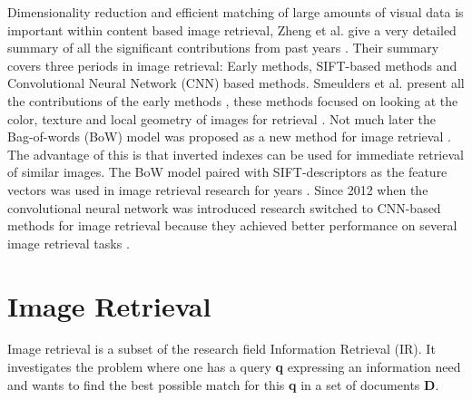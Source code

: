 \documentclass{article}
\begin{document}
Dimensionality reduction and efficient matching of large amounts of visual data is important within content based image retrieval, Zheng et al. give a very detailed summary of all the significant contributions from past years \cite{zheng2018sift}. Their summary covers three periods in image retrieval: Early methods, SIFT-based methods and Convolutional Neural Network (CNN) based methods. Smeulders et al. present all the contributions of the early methods \cite{smeulders2000content}, these methods focused on looking at the color, texture and local geometry of images for retrieval \cite{yu2002color,manjunath1996texture}. Not much later the Bag-of-words (BoW) model was proposed as a new method for image retrieval \cite{sivic2003video}. The advantage of this is that inverted indexes can be used for immediate retrieval of similar images. The BoW model paired with SIFT-descriptors \cite{lowe2004distinctive} as the feature vectors was used in image retrieval research for years \cite{nister2006scalable,philbin2007object,jegou2008hamming,jegou2010aggregating,jegou2012aggregating}. Since 2012 when the convolutional neural network was introduced \cite{krizhevsky2012imagenet} research switched to CNN-based methods for image retrieval because they achieved better performance on several image retrieval tasks	 \cite{babenko2014neural,yue2015exploiting, tolias2015particular}.

\section{Image Retrieval} \label{section:imageretrieval}
Image retrieval is a subset of the research field Information Retrieval (IR). It investigates the problem where one has a query \textbf{q} expressing an information need and wants to find the best possible match for this \textbf{q} in a set of documents \textbf{D}.
\end{document}
